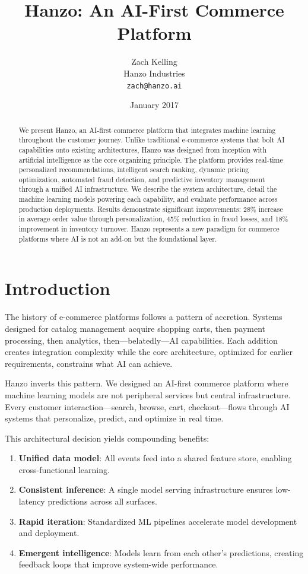\documentclass[11pt,twocolumn]{article}
\title{Hanzo: An AI-First Commerce Platform}
\author{Zach Kelling\\
Hanzo Industries\\
\texttt{zach@hanzo.ai}}
\date{January 2017}
\begin{document}
\luxcoverpage
\maketitle

\begin{abstract}
We present Hanzo, an AI-first commerce platform that integrates machine learning throughout the customer journey. Unlike traditional e-commerce systems that bolt AI capabilities onto existing architectures, Hanzo was designed from inception with artificial intelligence as the core organizing principle. The platform provides real-time personalized recommendations, intelligent search ranking, dynamic pricing optimization, automated fraud detection, and predictive inventory management through a unified AI infrastructure. We describe the system architecture, detail the machine learning models powering each capability, and evaluate performance across production deployments. Results demonstrate significant improvements: 28\% increase in average order value through personalization, 45\% reduction in fraud losses, and 18\% improvement in inventory turnover. Hanzo represents a new paradigm for commerce platforms where AI is not an add-on but the foundational layer.
\end{abstract}

\section{Introduction}

The history of e-commerce platforms follows a pattern of accretion. Systems designed for catalog management acquire shopping carts, then payment processing, then analytics, then---belatedly---AI capabilities. Each addition creates integration complexity while the core architecture, optimized for earlier requirements, constrains what AI can achieve.

Hanzo inverts this pattern. We designed an AI-first commerce platform where machine learning models are not peripheral services but central infrastructure. Every customer interaction---search, browse, cart, checkout---flows through AI systems that personalize, predict, and optimize in real time.

This architectural decision yields compounding benefits:
\begin{enumerate}
\item \textbf{Unified data model}: All events feed into a shared feature store, enabling cross-functional learning.
\item \textbf{Consistent inference}: A single model serving infrastructure ensures low-latency predictions across all surfaces.
\item \textbf{Rapid iteration}: Standardized ML pipelines accelerate model development and deployment.
\item \textbf{Emergent intelligence}: Models learn from each other's predictions, creating feedback loops that improve system-wide performance.
\end{enumerate}
\end{document}
